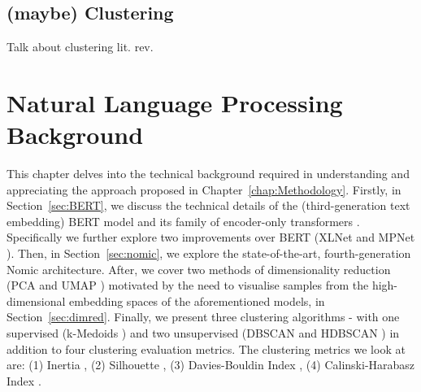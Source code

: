 \documentclass[10pt,oneside]{report}
\begin{document}
\section{(maybe) Clustering}
Talk about clustering lit. rev.


\chapter{Natural Language Processing Background}
This chapter delves into the technical background required in understanding and appreciating the approach proposed in Chapter~\ref{chap:Methodology}. Firstly, in Section~\ref{sec:BERT}, we discuss the technical details of the (third-generation text embedding) BERT model and its family of encoder-only transformers \cite{devlin2019bert}. Specifically we further explore two improvements over BERT (XLNet \cite{yang2019xlnet} and MPNet \cite{song2020mpnet}). Then, in Section~\ref{sec:nomic}, we explore the state-of-the-art, fourth-generation Nomic \cite{nussbaum2024nomic} architecture. After, we cover two methods of dimensionality reduction (PCA \cite{pearson1901liii,hotelling1933analysis} and UMAP \cite{mcinnes2018umap}) motivated by the need to visualise samples from the high-dimensional embedding spaces of the aforementioned models, in Section~\ref{sec:dimred}. Finally, we present three clustering algorithms - with one supervised (k-Medoids \cite{}) and two unsupervised (DBSCAN \cite{ester1996density} and HDBSCAN \cite{campello2013density}) in addition to four clustering evaluation metrics. The clustering metrics we look at are: (1) Inertia \cite{}, (2) Silhouette \cite{rousseeuw1987silhouettes}, (3) Davies-Bouldin Index \cite{davies1979cluster}, (4) Calinski-Harabasz Index \cite{calinski1974dendrite}.  \\ 
\end{document}
